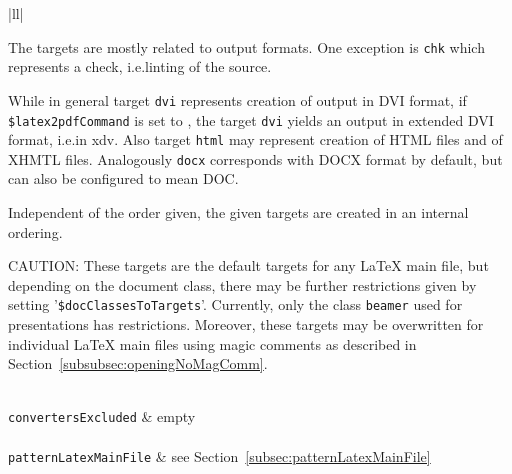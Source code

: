 \begin{longtable}{|ll|}
{\begin{minipage}{0.95\linewidth}
The targets are mostly related to output formats. 
One exception is \texttt{chk} which represents a check, i.e.\@ linting of the source. 

While in general target \texttt{dvi} represents creation of output in DVI format, 
if \texttt{\$latex2pdfCommand} is set to \xelatex, 
the target \texttt{dvi} yields an output in extended DVI format, i.e.\@ in \gls{xdv}\@. 
Also target \texttt{html} may represent creation of HTML files and of XHMTL files. 
Analogously \texttt{docx} corresponds with DOCX format by default, 
but can also be configured to mean DOC\@. 

Independent of the order given, the given targets are created 
in an internal ordering. 

CAUTION\@: These targets are the default targets for any \LaTeX{} main file, 
but depending on the document class, there may be further restrictions 
given by setting '\texttt{\$docClassesToTargets}'. 
Currently, only the class \texttt{beamer} used for presentations has restrictions. 
Moreover, these targets may be overwritten for individual \LaTeX{} main files 
using magic comments as described in Section~\ref{subsubsec:openingNoMagComm}. 

\end{minipage}
} \\
\texttt{convertersExcluded}          & empty     \\
 \\
\texttt{patternLatexMainFile} & see Section~\ref{subsec:patternLatexMainFile}\\
\end{longtable}
